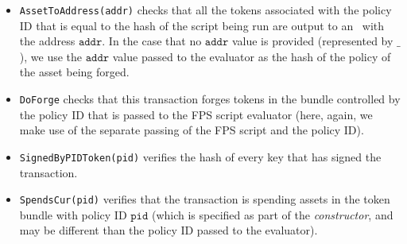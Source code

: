 \begin{itemize}
  \item \texttt{AssetToAddress(addr)}
  checks that all the tokens associated with the policy ID that
  is equal to the hash of the script being run are output
  to an \UTXO\ with the address $\texttt{addr}$. In the case that no $\texttt{addr}$ value is
  provided (represented by $\_$), we use the $\texttt{addr}$ value passed to the evaluator as
  the hash of the policy of the asset being forged.

  \item \texttt{DoForge}
  checks that this transaction forges tokens in the bundle controlled by the policy ID that is passed
  to the FPS script evaluator (here, again, we make use of the separate passing of
  the FPS script and the policy ID).

  \item \texttt{SignedByPIDToken(pid)} verifies the hash of every key that has signed the transaction.

  \item \texttt{SpendsCur(pid)}
  verifies that the transaction is spending assets in the token bundle with policy
  ID $\texttt{pid}$ (which is specified as part of the \emph{constructor}, and may be different
  than the policy ID passed to the evaluator).

\end{itemize}

